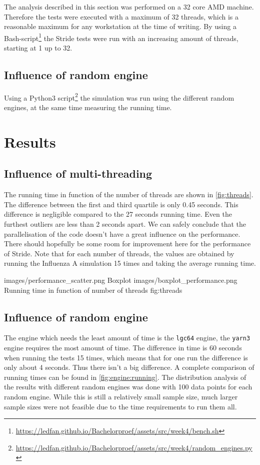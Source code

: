 \documentclass{acmart}
\begin{document}
The analysis described in this section was performed on a 32 core AMD machine. Therefore the tests were executed with a maximum of 32 threads, which is a reasonable maximum for any workstation at the time of writing. By using a Bash-script\footnote{\url{https://ledfan.github.io/Bachelorproef/assets/src/week4/bench.sh}} %
the Stride tests were run with an increasing amount of threads, starting at 1 up to 32.

\subsection{Influence of random engine}

Using a Python3 script\footnote{\url{https://ledfan.github.io/Bachelorproef/assets/src/week4/random\_engines.py}} 
the simulation was run using the different random engines, at the same time measuring the running time.

\section{Results}

\subsection{Influence of multi-threading}
The running time in function of the number of threads are shown in \cref{fig:threads}. The difference between the first and third
quartile is only 0.45 seconds. This difference is negligible compared to the 27 seconds running time. Even the furthest outliers are less than 2 seconds apart. We can safely conclude
that the parallelisation of the code doesn’t have a great influence on the performance. There should hopefully be some room for improvement here for the performance of Stride.
Note that for each number of threads, the values are obtained by running the Influenza A simulation 15 times and taking the average running time.

    {images/performance_scatter.png}
    {Boxplot}
    {images/boxplot_performance.png}
    {Running time in function of number of threads}
    {fig:threads}
\subsection{Influence of random engine}
The engine which needs the least amount of time is the \texttt{lgc64} engine, the \texttt{yarn3} engine requires the most amount of time. The difference in time is 60 seconds when running the tests 15 times, which means that for one run the difference is only about 4 seconds. Thus there isn’t a big difference. A complete comparison of running times can be found in \cref{fig:engine:running}.
The distribution analysis of the results with different random engines was done with 100 data points for each random engine. While this is still a relatively small sample size, much larger sample sizes were not feasible due to the time requirements to run them all.
\end{document}
